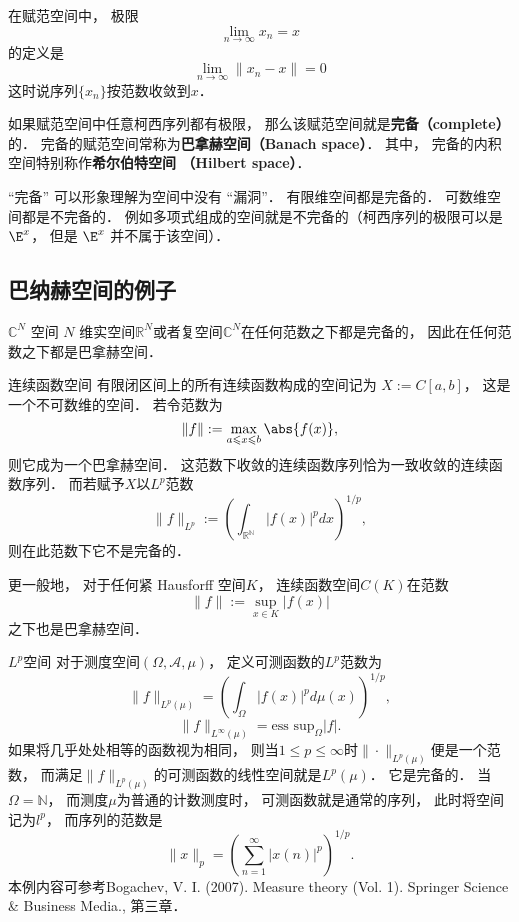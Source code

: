 
在赋范空间中， 极限
\begin{equation}
\lim_{n\to\infty} x_n = x
\end{equation}
的定义是
\begin{equation}
\lim_{n\to\infty} \|{x_n - x}\|= 0
\end{equation}
这时说序列$\{x_n\}$按范数收敛到$x$．

如果赋范空间中任意柯西序列都有极限， 那么该赋范空间就是\textbf{完备（complete）}的． 完备的赋范空间常称为\textbf{巴拿赫空间（Banach space）}． 其中， 完备的内积空间特别称作\textbf{希尔伯特空间 （Hilbert space）}．

“完备” 可以形象理解为空间中没有 “漏洞”． 有限维空间都是完备的． 可数维空间都是不完备的． 例如多项式组成的空间就是不完备的（柯西序列的极限可以是 $\E^x$， 但是 $\E^x$ 并不属于该空间）．

\subsection{巴纳赫空间的例子}
\begin{example}{$\mathbb C^N$ 空间}
$N$ 维实空间$\mathbb R^N$或者复空间$\mathbb C^N$在任何范数之下都是完备的， 因此在任何范数之下都是巴拿赫空间．
\end{example}

\begin{example}{连续函数空间}
有限闭区间上的所有连续函数构成的空间记为 $X := C[a, b]$， 这是一个不可数维的空间． 若令范数为
$$
\|{f}\|:= \max_{a \leqslant x \leqslant b} \abs{f(x)},
$$
则它成为一个巴拿赫空间． 这范数下收敛的连续函数序列恰为一致收敛的连续函数序列． 而若赋予$X$以$L^p$范数
$$
\|f\|_{L^p}:=\left(\int_{\mathbb{R^N}}|f(x)|^pdx\right)^{1/p},
$$
则在此范数下它不是完备的．

更一般地， 对于任何紧 Hausforff 空间$K$， 连续函数空间$C(K)$在范数
$$
\|f\|:=\sup_{x\in K}|f(x)|
$$
之下也是巴拿赫空间．
\end{example}

\begin{example}{$L^p$空间}
对于测度空间$(\Omega,\mathcal{A},\mu)$， 定义可测函数的$L^p$范数为
$$
\|f\|_{L^p(\mu)}=\left(\int_\Omega |f(x)|^pd\mu(x)\right)^{1/p},
$$
$$
\|f\|_{L^\infty(\mu)}=\text{ess sup}_{\Omega}|f|.
$$
如果将几乎处处相等的函数视为相同， 则当$1\leq p\leq\infty$时$\|\cdot\|_{L^p(\mu)}$便是一个范数， 而满足$\|f\|_{L^p(\mu)}$的可测函数的线性空间就是$L^p(\mu)$． 它是完备的． 当$\Omega=\mathbb{N}$， 而测度$\mu$为普通的计数测度时， 可测函数就是通常的序列， 此时将空间记为$l^p$， 而序列的范数是
$$
\|x\|_p=\left(\sum_{n=1}^\infty|x(n)|^p\right)^{1/p}.
$$
本例内容可参考Bogachev, V. I. (2007). Measure theory (Vol. 1). Springer Science \& Business Media., 第三章．
\end{example}

